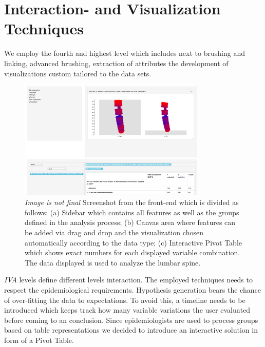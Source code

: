 \documentclass[journal]{style/vgtc} 			          %
\begin{document}
\section{Interaction- and Visualization Techniques}
We employ the fourth and highest level which includes next to brushing and linking, advanced brushing, extraction of attributes the development of visualizations custom tailored to the data sets.
\begin{figure}[htb]
 \centering
 \includegraphics[width=3.5in]{figures/visualization}
 \caption{\emph{Image is not final} Screenshot from the front-end which is divided as follows: (a) Sidebar which contains all features as well as the groups defined in the analysis process; (b) Canvas area where features can be added via drag and drop and the visualization chosen automatically according to the data type; (c) Interactive Pivot Table which shows exact numbers for each displayed variable combination. The data displayed is used to analyze the lumbar spine.
 }
 \label{fig:visualization}
\end{figure}
\emph{IVA} levels define different levels interaction. 
%
The employed techniques needs to respect the epidemiological requirements.
%
Hypothesis generation bears the chance of over-fitting the data to expectations.
%
To avoid this, a timeline needs to be introduced which keeps track how many variable variations the user evaluated before coming to an conclusion.
%
Since epidemiologists are used to process groups based on table representations we decided to introduce an interactive solution in form of a Pivot Table.
\end{document}
